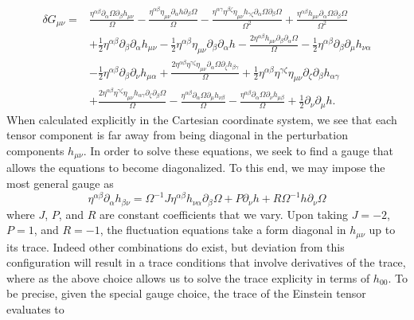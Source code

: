 \documentclass[10pt,letterpaper]{article}
\begin{document}
\begin{align}
\delta G_{\mu\nu} ={}&\frac{\eta^{\alpha \beta} \partial_{\alpha}\Omega \partial_{\beta}h_{\mu \nu}}{\Omega}
 -  \frac{\eta^{\alpha \beta} \eta_{\mu \nu} \partial_{\alpha}h \partial_{\beta}\Omega}{\Omega}
 -  \frac{\eta^{\alpha \gamma} \eta^{\beta \zeta} \eta_{\mu \nu} h_{\gamma \zeta} \partial_{\alpha}\Omega \partial_{\beta}\Omega}{\Omega^2}
 + \frac{\eta^{\alpha \beta} h_{\mu \nu} \partial_{\alpha}\Omega \partial_{\beta}\Omega}{\Omega^2}\nonumber\\
& + \tfrac{1}{2} \eta^{\alpha \beta} \partial_{\beta}\partial_{\alpha}h_{\mu \nu}
 -  \tfrac{1}{2} \eta^{\alpha \beta} \eta_{\mu \nu} \partial_{\beta}\partial_{\alpha}h
 -  \frac{2 \eta^{\alpha \beta} h_{\mu \nu} \partial_{\beta}\partial_{\alpha}\Omega}{\Omega}
 -  \tfrac{1}{2} \eta^{\alpha \beta} \partial_{\beta}\partial_{\mu}h_{\nu \alpha}\nonumber\\
& -  \tfrac{1}{2} \eta^{\alpha \beta} \partial_{\beta}\partial_{\nu}h_{\mu \alpha}
 + \frac{2 \eta^{\alpha \beta} \eta^{\gamma \zeta} \eta_{\mu \nu} \partial_{\alpha}\Omega \partial_{\zeta}h_{\beta \gamma}}{\Omega}
 + \tfrac{1}{2} \eta^{\alpha \beta} \eta^{\gamma \zeta} \eta_{\mu \nu} \partial_{\zeta}\partial_{\beta}h_{\alpha \gamma}\nonumber\\
& + \frac{2 \eta^{\alpha \beta} \eta^{\gamma \zeta} \eta_{\mu \nu} h_{\alpha \gamma} \partial_{\zeta}\partial_{\beta}\Omega}{\Omega}
 -  \frac{\eta^{\alpha \beta} \partial_{\alpha}\Omega \partial_{\mu}h_{\nu \beta}}{\Omega}
 -  \frac{\eta^{\alpha \beta} \partial_{\alpha}\Omega \partial_{\nu}h_{\mu \beta}}{\Omega}
 + \tfrac{1}{2} \partial_{\nu}\partial_{\mu}h.
\end{align}
When calculated explicitly in the Cartesian coordinate system, we see that each tensor component is far away from being diagonal in the perturbation components $h_{\mu\nu}$. In order to solve these equations, we seek to find a gauge that allows the equations to become diagonalized. To this end, we may impose the most general gauge as
\begin{equation}
	\eta^{\alpha\beta}\partial_{\alpha}h_{\beta\nu} = \Omega^{-1} J \eta^{\alpha\beta}h_{\nu\alpha}\partial_\beta \Omega + P \partial_\nu h + R \Omega^{-1} h \partial_\nu \Omega
\end{equation}
where $J$, $P$, and $R$ are constant coefficients that we vary. Upon taking $J = -2$, $P = 1$, and $R = -1$, the fluctuation equations take a form diagonal in $h_{\mu\nu}$ up to its trace. Indeed other combinations do exist, but deviation from this configuration will result in a trace conditions that involve derivatives of the trace, where as the above choice allows us to solve the trace explicity in terms of $h_{00}$. To be precise, given the special gauge choice, the trace of the Einstein tensor evaluates to
\end{document}
